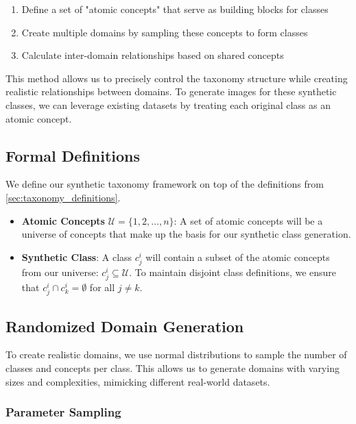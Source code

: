 \begin{enumerate}
    \item Define a set of "atomic concepts" that serve as building blocks for classes
    \item Create multiple domains by sampling these concepts to form classes
    \item Calculate inter-domain relationships based on shared concepts
\end{enumerate}

This method allows us to precisely control the taxonomy structure while creating realistic relationships between domains. To generate images for these synthetic classes, we can leverage existing datasets by treating each original class as an atomic concept.

\subsection{Formal Definitions}

We define our synthetic taxonomy framework on top of the definitions from \autoref{sec:taxonomy_definitions}.

\begin{itemize}
    \item \textbf{Atomic Concepts} $\mathcal{U}=\{1,2,\ldots,n\}$:
          A set of atomic concepts will be a universe of concepts that make up the basis for our synthetic class generation.
    \item \textbf{Synthetic Class}: A class $c^i_j$ will contain a subset of the atomic concepts
          from our universe: $c^i_j \subseteq \mathcal{U}$.
          To maintain disjoint class definitions, we ensure that $c^i_j \cap c^i_k = \emptyset$ for all $j \neq k$.
\end{itemize}

\subsection{Randomized Domain Generation}

To create realistic domains, we use normal distributions to sample the number of classes and concepts per class.
This allows us to generate domains with varying sizes and complexities, mimicking different real-world datasets.

\subsubsection{Parameter Sampling}

